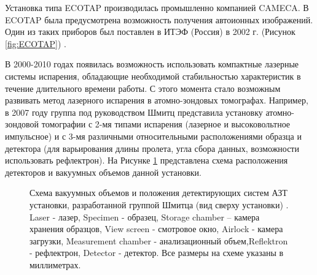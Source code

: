 Установка типа ECOTAP производилась промышленно компанией CAMECA. В ECOTAP была предусмотрена возможность получения автоионных изображений. Один из таких приборов был поставлен в ИТЭФ (Россия) в 2002 г. (Рисунок \cref{fig:ECOTAP}) \cite{Suvorov06}.

В 2000-2010 годах появилась возможность использовать компактные лазерные системы испарения, обладающие необходимой стабильностью характеристик в течение длительного времени работы. С этого момента стало возможным развивать метод лазерного  испарения в атомно-зондовых томографах. Например, в 2007 году группа под руководством Шмитц  \cite{Stender07} представила установку атомно-зондовой томографии с 2-мя типами испарения (лазерное и высоковольтное импульсное) и с 3-мя различными относительными расположениями образца и детектора (для варьирования длины пролета, угла сбора данных, возможности использовать рефлектрон). На Рисунке \cref{fig:Schmitz} представлена схема расположения детекторов и вакуумных объемов данной установки. 

\begin{figure}[htb]
	\caption{Схема вакуумных объемов и положения детектирующих систем АЗТ установки, разработанной группой Шмитца (вид сверху установки) \cite{Stender07}.  Laser - лазер, Specimen - образец, Storage chamber – камера хранения образцов, View screen - смотровое окно, Airlock - камера загрузки, Measurement chamber - анализационный объем,Reflektron - рефлектрон, Detector - детектор. Все размеры на схеме указаны в миллиметрах.}
	\label{fig:Schmitz}
\end{figure}

